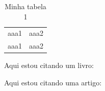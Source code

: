 \documentclass[a4paper, 12pt]{article}
\begin{document}
 \begin{table}[htb]
   \centering
   \begin{tabular}{|c|c|}
     aaa1 & aaa2 \\
     aaa1 & aaa2 \\
   \end{tabular}
   \caption{Minha tabela 1}
   \label{minha-tabelinha}
 \end{table}
 
 Aqui estou citando um livro: \cite{meuatalho} 

 Aqui estou citando uma artigo: \cite{meuatalho2}
 

\newpage

\end{document}
